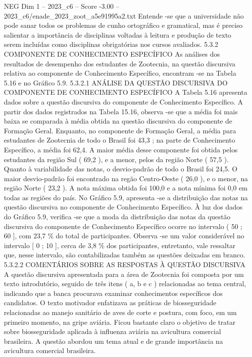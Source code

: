 \begin{textsample}{NEG Dim 1 – 2023\_c6 – Score -3.00 – 2023\_c6/enade\_2023\_zoot\_a5e91995a2.txt}
Entende -se que a universidade não pode sanar todos os problemas de cunho ortográfico e gramatical, mas é preciso salientar a importância de disciplinas voltadas à leitura e produção de texto serem incluídas como disciplinas obrigatórias nos cursos avaliados. 5.3.2 COMPONENTE DE CONHECIMENTO ESPECÍFICO As análises dos resultados de desempenho dos estudantes de Zootecnia, na questão discursiva relativa ao componente de Conhecimento Específico, encontram -se na Tabela 5.16 e no Gráfico 5.9. 5.3.2.1 ANÁLISE DA QUESTÃO DISCURSIVA DO COMPONENTE DE CONHECIMENTO ESPECÍFICO A Tabela 5.16 apresenta dados sobre a questão discursiva do componente de Conhecimento Específico.
A partir dos dados registrados na Tabela 15.16, observa -se que a média foi mais baixa se comparada à média obtida na questão discursiva do componente de Formação Geral.
Enquanto, no componente de Formação Geral, a média para estudantes de Zootecnia de todo o Brasil foi 43,3 ; na parte de Conhecimento Específico, a média foi 62,4.
A maior média desse componente foi obtida pelos estudantes da região Sul ( 69,2 ), e a menor, pelos da região Norte ( 57,5 ).
Quanto à variabilidade das notas, o desvio-padrão de todo o Brasil foi 24,5.
O maior desvio-padrão foi encontrado na regão Centro-Oeste ( 26,0 ), e o menor, na região Norte ( 23,2 ).
A nota máxima obtida foi 100,0 e a nota mínima foi 0,0 em todas as regiões do país.
No Gráfico 5.9, apresenta -se a distribuição das notas na questão discursiva no componente de Conhecimento Específico.
À luz dos dados do Gráfico 5.9, verifica -se que a moda da distribuição das notas da questão discursiva do componente de Conhecimento Específico ocorre no intervalo ( 50 ; 60 ], com 23,7 \% do total de participantes.
Observa -se um valor considerável no intervalo [ 0 ; 10 ], cerca de 3,8 \% dos participantes, entretanto, vale ressaltar que, nesse intervalo, são contabilizadas também as questões deixadas em branco. 5.3.2.2 COMENTÁRIOS SOBRE AS RESPOSTAS À QUESTÃO DISCURSIVA A questão discursiva apresentada para a área de Zootecnia foi composta por um texto introdutório, seguido de três itens ( a, b e c ) relacionadas ao tema central, indicando que a banca procurava examinar conhecimentos específicos dos candidatos.
O texto motivador enfatizava as práticas de biosseguridade relacionadas ao manejo sanitário de aves de corte e postura, com foco, em um primeiro momento, na gripe aviária.
Ficou bastante claro o objetivo de tratar sobre biosseguridade aplicada à influenza aviária na avicultura comercial brasileira.
A questão abordou um tema atual e de grande importância na avicultura comercial brasileira.

\end{textsample}
